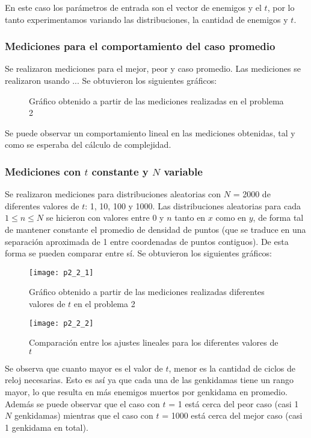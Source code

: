 En este caso los parámetros de entrada son el vector de enemigos y el $t$, por lo tanto experimentamos variando las distribuciones, la cantidad de enemigos y $t$.

\subsubsection{Mediciones para el comportamiento del caso promedio}

Se realizaron mediciones para el mejor, peor y caso promedio. Las mediciones se realizaron usando ... %
Se obtuvieron los siguientes gráficos:

\begin{figure}[h!]
\caption{Gráfico obtenido a partir de las mediciones realizadas en el problema 2}
\end{figure}

Se puede observar un comportamiento lineal en las mediciones obtenidas, tal y como se esperaba del cálculo de complejidad.

\subsubsection{Mediciones con $t$ constante y $N$ variable}

Se realizaron mediciones para distribuciones aleatorias con $N$ = 2000 de diferentes valores de $t$: 1, 10, 100 y 1000. Las distribuciones aleatorias para cada $1 \leq n \leq N$ se hicieron con valores entre 0 y $n$ tanto en $x$ como en $y$, de forma tal de mantener constante el promedio de densidad de puntos (que se traduce en una separación aproximada de 1 entre coordenadas de puntos contiguos). De esta forma se pueden comparar entre sí. Se obtuvieron los siguientes gráficos:

\begin{figure}[h!]
\texttt{[image: p2\_2\_1]}
\caption{Gráfico obtenido a partir de las mediciones realizadas diferentes valores de $t$ en el problema 2}
\end{figure}

\begin{figure}[h!]
\texttt{[image: p2\_2\_2]}
\caption{Comparación entre los ajustes lineales para los diferentes valores de $t$}
\end{figure}

Se observa que cuanto mayor es el valor de $t$, menor es la cantidad de ciclos de reloj necesarias. Esto es así ya que cada una de las genkidamas tiene un rango mayor, lo que resulta en más enemigos muertos por genkidama en promedio. Además se puede observar que el caso con $t$ = 1 está cerca del peor caso (casi 1 $N$ genkidamas) mientras que el caso con $t$ = 1000 está cerca del mejor caso (casi 1 genkidama en total).

